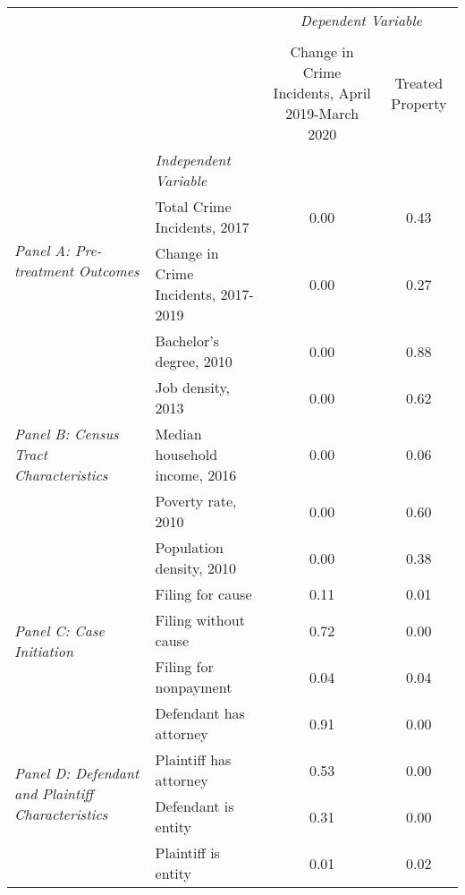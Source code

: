 \begin{tabular}{llcc}
\toprule
 &  & \multicolumn{2}{c}{\textit{Dependent Variable}} \\
\cline{3-4}
\\
 &  & Change in Crime Incidents, April 2019-March 2020 & Treated Property \\
 & \emph{Independent Variable} &  &  \\
\midrule
\multirow[c]{2}{3cm}{\textit{Panel A: Pre-treatment Outcomes}} & Total Crime Incidents, 2017 & 0.00 & 0.43 \\
 & Change in Crime Incidents, 2017-2019 & 0.00 & 0.27 \\
\cline{1-4}
\multirow[c]{5}{3cm}{\textit{Panel B: Census Tract Characteristics}} & Bachelor's degree, 2010 & 0.00 & 0.88 \\
 & Job density, 2013 & 0.00 & 0.62 \\
 & Median household income, 2016 & 0.00 & 0.06 \\
 & Poverty rate, 2010 & 0.00 & 0.60 \\
 & Population density, 2010 & 0.00 & 0.38 \\
\cline{1-4}
\multirow[c]{3}{3cm}{\textit{Panel C: Case Initiation}} & Filing for cause & 0.11 & 0.01 \\
 & Filing without cause & 0.72 & 0.00 \\
 & Filing for nonpayment & 0.04 & 0.04 \\
\cline{1-4}
\multirow[c]{4}{3cm}{\textit{Panel D: Defendant and Plaintiff Characteristics}} & Defendant has attorney & 0.91 & 0.00 \\
 & Plaintiff has attorney & 0.53 & 0.00 \\
 & Defendant is entity & 0.31 & 0.00 \\
 & Plaintiff is entity & 0.01 & 0.02 \\
\cline{1-4}
\bottomrule
\end{tabular}
